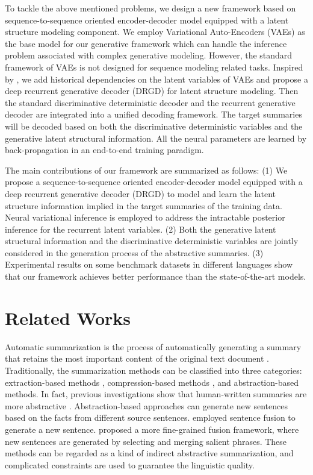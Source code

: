 \documentclass[11pt,letterpaper]{article}
\begin{document}
To tackle the above mentioned problems, we design a new framework based on sequence-to-sequence oriented encoder-decoder model equipped with a latent structure modeling component.  
We employ Variational Auto-Encoders (VAEs) \cite{kingma2013auto,rezende2014stochastic} as the base model for our generative framework which can handle the inference problem associated with complex generative modeling.
However, the standard framework of VAEs is not designed for sequence modeling related tasks.
Inspired by \cite{chung2015recurrent}, we add historical dependencies on the latent variables of VAEs and propose a deep recurrent generative decoder (DRGD) for latent structure modeling.
Then the standard discriminative deterministic decoder and the recurrent generative decoder are integrated into a unified decoding framework.
The target summaries will be decoded based on both the discriminative deterministic variables and the generative latent structural information.
All the neural parameters are learned by back-propagation in an end-to-end training paradigm.


The main contributions of our framework are summarized as follows:
(1) We propose a sequence-to-sequence oriented encoder-decoder model equipped with a deep recurrent generative decoder (DRGD) to model and learn the latent structure information implied in the target summaries of the training data. Neural variational inference is employed to address the intractable posterior inference for the recurrent latent variables.
(2) Both the generative latent structural information and the discriminative deterministic variables are jointly considered in the generation process of the abstractive summaries.
(3) Experimental results on some benchmark datasets in different languages show that our framework achieves better performance than the state-of-the-art models.


\section{Related Works}
Automatic summarization is the process of automatically generating a summary that retains the most important content of the original text document \cite{nenkova2012survey}.
Traditionally, the summarization methods can be classified into three categories:  extraction-based methods \cite{erkan2004lexrank,goldstein2000multi,wan2007manifold,min2012exploiting,nallapati2016summarunner,cheng2016neural,cao2016attsum,song2017summarizing}, compression-based methods \cite{li2013document,wang2013sentence,li2015reader,li2017salience}, and abstraction-based methods.
In fact, previous investigations show that human-written summaries are more abstractive \cite{barzilay2005sentence,lidong15absmds}.
Abstraction-based approaches can generate new sentences based on the facts from different source sentences.
\citet{barzilay2005sentence} employed sentence fusion to generate
a new sentence. \citet{lidong15absmds} proposed a more fine-grained fusion framework, where new sentences are generated by selecting and merging salient phrases.
These methods can be regarded as a kind of indirect abstractive summarization, and complicated constraints are used to guarantee the linguistic quality.
\end{document}
